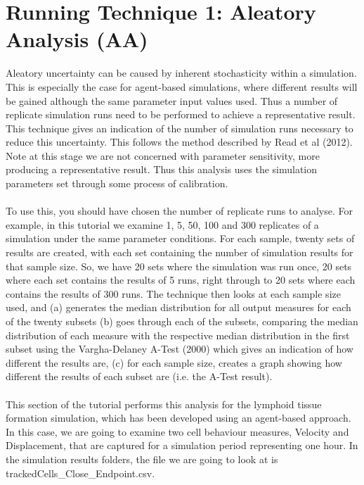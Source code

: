 \documentclass[a4paper,11pt]{article}
\begin{document}
\section{Running Technique 1: Aleatory Analysis (AA)}
\noindent Aleatory uncertainty can be caused by inherent stochasticity within a simulation. This is especially the case for agent-based simulations, where different results will be gained although the same parameter input values used. Thus a number of replicate simulation runs need to be performed to achieve a representative result. This technique gives an indication of the number of simulation runs necessary to reduce this uncertainty. This follows the method described by Read et al (2012).  Note at this stage we are not concerned with parameter sensitivity, more producing a representative result.  Thus this analysis uses the simulation parameters set through some process of calibration.\\
\\
To use this, you should have chosen the number of replicate runs to analyse. For example, in this tutorial we examine 1, 5, 50, 100 and 300 replicates of a simulation under the same parameter conditions.  For each sample, twenty sets of results are created, with each set containing the number of simulation results for that sample size.  So, we have 20 sets where the simulation was run once, 20 sets where each set contains the results of 5 runs, right through to 20 sets where each contains the results of 300 runs. The technique then looks at each sample size used, and (a) generates the median distribution for all output measures for each of the twenty subsets (b) goes through each of the subsets, comparing the median distribution of each measure with the respective median distribution in the first subset using the Vargha-Delaney A-Test (2000) which gives an indication of how different the results are, (c) for each sample size, creates a graph showing how different the results of each subset are (i.e. the A-Test result).\\
\\
This section of the tutorial performs this analysis for the lymphoid tissue formation simulation, which has been developed using an agent-based approach. In this case, we are going to examine two cell behaviour measures, Velocity and Displacement, that are captured for a simulation period representing one hour. In the simulation results folders, the file we are going to look at is trackedCells\_Close\_Endpoint.csv.
\end{document}
